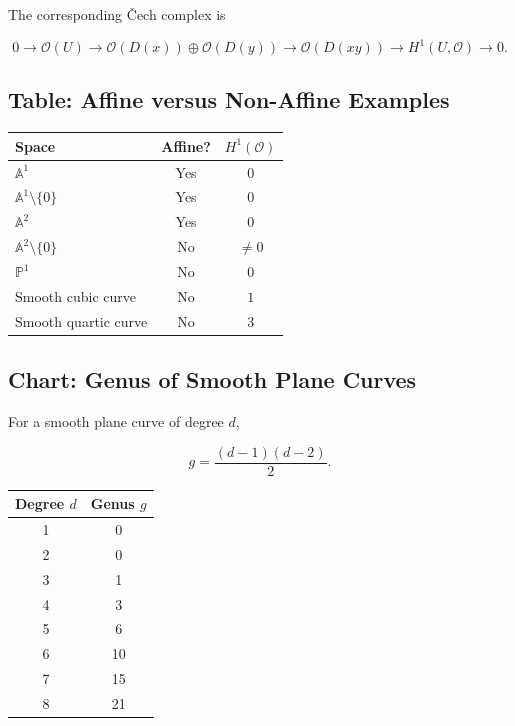 \documentclass[12pt,a4paper]{article}
\theoremstyle{notespace}
\begin{document}
The corresponding \v{C}ech complex is

\[
0
\to
\mathcal O(U)
\to
\mathcal O(D(x))
\oplus
\mathcal O(D(y))
\to
\mathcal O(D(xy))
\to
H^1(U,\mathcal O)
\to0.
\]

\subsection{Table: Affine versus Non-Affine Examples}

\begin{center}
	\begin{tabular}{|l|c|c|}
		\hline
		Space & Affine? & $H^1(\mathcal O)$ \\
		\hline
		$\mathbb A^1$ & Yes & $0$ \\
		\hline
		$\mathbb A^1\setminus\{0\}$ & Yes & $0$ \\
		\hline
		$\mathbb A^2$ & Yes & $0$ \\
		\hline
		$\mathbb A^2\setminus\{0\}$ & No & $\neq0$ \\
		\hline
		$\mathbb P^1$ & No & $0$ \\
		\hline
		Smooth cubic curve & No & $1$ \\
		\hline
		Smooth quartic curve & No & $3$ \\
		\hline
	\end{tabular}
\end{center}

\subsection{Chart: Genus of Smooth Plane Curves}

For a smooth plane curve of degree $d$,

\[
g=\frac{(d-1)(d-2)}2.
\]

\begin{center}
	\begin{tabular}{|c|c|}
		\hline
		Degree $d$ & Genus $g$ \\
		\hline
		1 & 0 \\
		\hline
		2 & 0 \\
		\hline
		3 & 1 \\
		\hline
		4 & 3 \\
		\hline
		5 & 6 \\
		\hline
		6 & 10 \\
		\hline
		7 & 15 \\
		\hline
		8 & 21 \\
		\hline
	\end{tabular}
\end{center}
\end{document}
